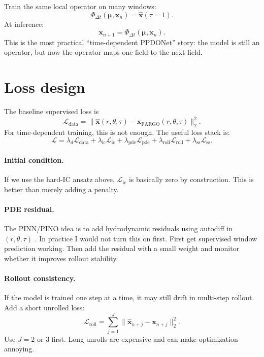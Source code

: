 \documentclass[11pt]{article}
\newcommand{\muvec}{\bm{\mu}}
\newcommand{\xfield}{\bm{x}}
\newcommand{\loss}{\mathcal{L}}
\begin{document}
Train the same local operator on many windows:
\begin{equation}
    \Phi_{\Delta t}(\muvec,\xfield_n)=\hat{\xfield}(\tau=1).
\end{equation}
At inference:
\begin{equation}
    \xfield_{n+1}=\Phi_{\Delta t}(\muvec,\xfield_n).
\end{equation}
This is the most practical ``time-dependent PPDONet'' story: the model is still
an operator, but now the operator maps one field to the next field.

\section{Loss design}

The baseline supervised loss is
\begin{equation}
    \loss_{\mathrm{data}}
    =
    \|\hat{\xfield}(r,\theta,\tau)-\xfield_{\mathrm{FARGO}}(r,\theta,\tau)\|_2^2.
\end{equation}
For time-dependent training, this is not enough. The useful loss stack is:
\begin{equation}
    \loss =
    \lambda_d\loss_{\mathrm{data}}
    +\lambda_{\mathrm{ic}}\loss_{\mathrm{ic}}
    +\lambda_{\mathrm{pde}}\loss_{\mathrm{pde}}
    +\lambda_{\mathrm{roll}}\loss_{\mathrm{roll}}
    +\lambda_{\mathrm{ss}}\loss_{\mathrm{ss}}.
\end{equation}

\paragraph{Initial condition.}
If we use the hard-IC ansatz above, \(\loss_{\mathrm{ic}}\) is basically zero by
construction. This is better than merely adding a penalty.

\paragraph{PDE residual.}
The PINN/PINO idea is to add hydrodynamic residuals using autodiff in
\((r,\theta,\tau)\) \cite{raissi2019pinn,li2021pino}. In practice I would not
turn this on first. First get supervised window prediction working. Then add the
residual with a small weight and monitor whether it improves rollout stability.

\paragraph{Rollout consistency.}
If the model is trained one step at a time, it may still drift in multi-step
rollout. Add a short unrolled loss:
\begin{equation}
    \loss_{\mathrm{roll}}
    =
    \sum_{j=1}^J
    \|\hat{\xfield}_{n+j}-\xfield_{n+j}\|_2^2.
\end{equation}
Use \(J=2\) or \(3\) first. Long unrolls are expensive and can make optimization
annoying.
\end{document}
